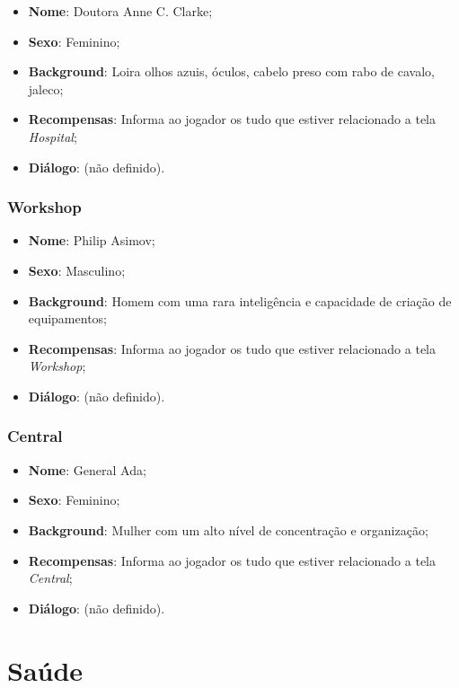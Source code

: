 \documentclass[11pt]{article} %
\begin{document}
\begin{itemize}
  \item \textbf{Nome}: Doutora Anne C. Clarke;
  \item \textbf{Sexo}: Feminino;
  \item \textbf{Background}: Loira olhos azuis, óculos, cabelo preso com rabo de cavalo, jaleco;
  \item \textbf{Recompensas}: Informa ao jogador os tudo que estiver relacionado a tela \textit{Hospital};
  \item \textbf{Diálogo}: (não definido).
\end{itemize}

\subsubsection{Workshop}

\begin{itemize}
  \item \textbf{Nome}: Philip Asimov;
  \item \textbf{Sexo}: Masculino;
  \item \textbf{Background}: Homem com uma rara inteligência e capacidade de criação de equipamentos;
  \item \textbf{Recompensas}: Informa ao jogador os tudo que estiver relacionado a tela \textit{Workshop};
  \item \textbf{Diálogo}: (não definido).
\end{itemize}

\subsubsection{Central}

\begin{itemize}
  \item \textbf{Nome}: General Ada;
  \item \textbf{Sexo}: Feminino;
  \item \textbf{Background}: Mulher com um alto nível de concentração e organização;
  \item \textbf{Recompensas}: Informa ao jogador os tudo que estiver relacionado a tela \textit{Central};
  \item \textbf{Diálogo}: (não definido).
\end{itemize}


\section{Saúde}
\end{document}
